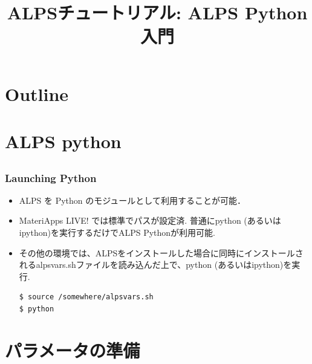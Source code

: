 
\title{ALPSチュートリアル: ALPS Python入門}



\begin{frame}
 \titlepage
\end{frame}

\section*{Outline}
\begin{frame}
 \tableofcontents
\end{frame}

\section{ALPS python}

\subsection*{\redm\whiteb\greenb}
\begin{frame}[t,fragile]
 \frametitle{Launching Python}
 \begin{itemize}
 \item \alert{ALPS を Python のモジュールとして利用することが可能．}

 \item MateriApps LIVE! では標準でパスが設定済. 普通にpython (あるいはipython)を実行するだけでALPS Pythonが利用可能.

 \item その他の環境では、ALPSをインストールした場合に同時にインストールされるalpsvars.shファイルを読み込んだ上で、python (あるいはipython)を実行.
\begin{lstlisting}
$ source /somewhere/alpsvars.sh
$ python
\end{lstlisting}
\end{itemize}
\end{frame}

\section{パラメータの準備}

